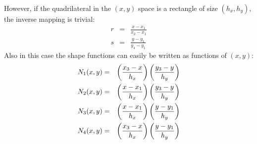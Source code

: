 However, if the quadrilateral in the $(x,y)$ space is a rectangle of size $(h_x,h_y)$, 
the inverse mapping is trivial:
\begin{eqnarray}
r&=&\frac{x-x_1}{x_2-x_1} \\
s&=&\frac{y-y_1}{y_4-y_1} 
\end{eqnarray}
Also in this case the shape functions can easily be written as functions of $(x,y)$:
\begin{eqnarray}
N_1(x,y) &=& \left( \frac{x_3 -x }{h_x}  \right) \left( \frac{y_3 -y }{h_y}  \right) \nonumber\\
N_2(x,y) &=& \left( \frac{x - x_1}{h_x}  \right) \left( \frac{y_3 -y }{h_y}  \right) \nonumber\\
N_3(x,y) &=& \left( \frac{x - x_1}{h_x}  \right) \left( \frac{y - y_1}{h_y}  \right) \nonumber\\
N_4(x,y) &=& \left( \frac{x_3 -x }{h_x}  \right) \left( \frac{y - y_1}{h_y}  \right) \nonumber 
\end{eqnarray}







 
